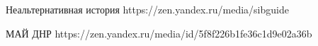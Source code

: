  
 
 
 
 

Неальтернативная история
https://zen.yandex.ru/media/sibguide

МАЙ ДНР
https://zen.yandex.ru/media/id/5f8f226b1fe36c1d9e02a36b
